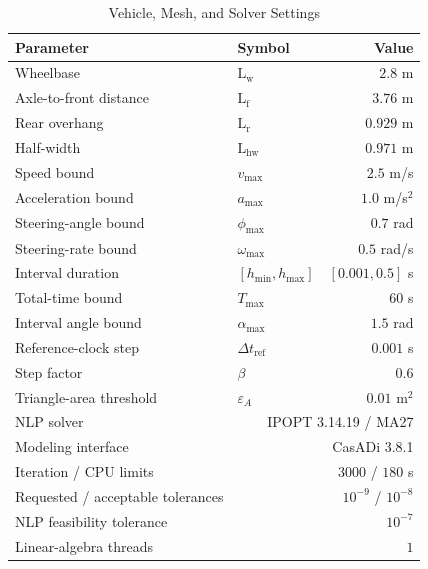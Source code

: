 \begin{table}[t]
\caption{Vehicle, Mesh, and Solver Settings}\label{tab:settings}
\centering\footnotesize
\begin{tabular}{@{}llr@{}}\toprule
Parameter&Symbol&Value\\\midrule
Wheelbase&$\mathrm{L}_{\mathrm w}$&$2.8$ m\\
Axle-to-front distance&$\mathrm{L}_{\mathrm f}$&$3.76$ m\\
Rear overhang&$\mathrm{L}_{\mathrm r}$&$0.929$ m\\
Half-width&$\mathrm{L}_{\mathrm{hw}}$&$0.971$ m\\
Speed bound&$v_{\max}$&$2.5$ m/s\\
Acceleration bound&$a_{\max}$&$1.0$ m/s$^2$\\
Steering-angle bound&$\phi_{\max}$&$0.7$ rad\\
Steering-rate bound&$\omega_{\max}$&$0.5$ rad/s\\
Interval duration&$[h_{\min},h_{\max}]$&$[0.001,0.5]$ s\\
Total-time bound&$T_{\max}$&$60$ s\\
Interval angle bound&$\alpha_{\max}$&$1.5$ rad\\
Reference-clock step&$\Delta t_{\mathrm{ref}}$&$0.001$ s\\
Step factor&$\beta$&$0.6$\\
Triangle-area threshold&$\varepsilon_A$&$0.01$ m$^2$\\\midrule
NLP solver&\multicolumn{2}{r}{IPOPT 3.14.19 / MA27}\\
Modeling interface&\multicolumn{2}{r}{CasADi 3.8.1}\\
Iteration / CPU limits&\multicolumn{2}{r}{$3000$ / $180$ s}\\
Requested / acceptable tolerances&\multicolumn{2}{r}{$10^{-9}$ / $10^{-8}$}\\
NLP feasibility tolerance&\multicolumn{2}{r}{$10^{-7}$}\\
Linear-algebra threads&\multicolumn{2}{r}{$1$}\\\bottomrule
\end{tabular}
\end{table}
